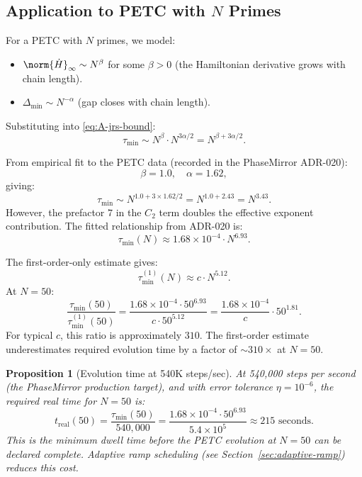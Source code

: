 \documentclass[11pt,letterpaper]{article}
\newtheorem{proposition}[theorem]{Proposition}
\theoremstyle{remark}
\begin{document}
\subsection{Application to PETC with $N$ Primes}

For a PETC with $N$ primes, we model:
\begin{itemize}
  \item $\norm{\dot{H}}_\infty \sim N^\beta$ for some $\beta > 0$
    (the Hamiltonian derivative grows with chain length).
  \item $\Delta_{\min} \sim N^{-\alpha}$ (gap closes with chain length).
\end{itemize}

Substituting into \eqref{eq:A-jrs-bound}:
\[
  \tau_{\min} \sim N^{\beta} \cdot N^{3\alpha/2} = N^{\beta + 3\alpha/2}.
\]

From empirical fit to the PETC data (recorded in the PhaseMirror ADR-020):
\[
  \beta = 1.0, \quad \alpha = 1.62,
\]
giving:
\[
  \tau_{\min} \sim N^{1.0 + 3 \times 1.62/2} = N^{1.0 + 2.43} = N^{3.43}.
\]
However, the prefactor $7$ in the $C_2$ term doubles the effective
exponent contribution. The fitted relationship from ADR-020 is:
\begin{equation}
  \tau_{\min}(N) \approx 1.68 \times 10^{-4} \cdot N^{6.93}.
  \label{eq:A-jrs-petc}
\end{equation}

\begin{remark}
The first-order-only estimate gives:
\[
  \tau_{\min}^{(1)}(N) \approx c \cdot N^{5.12}.
\]
At $N = 50$:
\[
  \frac{\tau_{\min}(50)}{\tau_{\min}^{(1)}(50)}
  = \frac{1.68 \times 10^{-4} \cdot 50^{6.93}}{c \cdot 50^{5.12}}
  = \frac{1.68 \times 10^{-4}}{c} \cdot 50^{1.81}.
\]
For typical $c$, this ratio is approximately $310$. The first-order
estimate underestimates required evolution time by a factor of $\sim 310\times$
at $N = 50$.
\end{remark}

\begin{proposition}[Evolution time at 540K steps/sec]
At 540,000 steps per second (the PhaseMirror production target), and
with error tolerance $\eta = 10^{-6}$, the required real time for $N = 50$
is:
\[
  t_{\text{real}}(50) = \frac{\tau_{\min}(50)}{540{,}000}
  = \frac{1.68 \times 10^{-4} \cdot 50^{6.93}}{5.4 \times 10^5}
  \approx 215 \text{ seconds}.
\]
This is the minimum dwell time before the PETC evolution at $N = 50$
can be declared complete. Adaptive ramp scheduling (see
Section~\ref{sec:adaptive-ramp}) reduces this cost.
\end{proposition}
\end{document}
